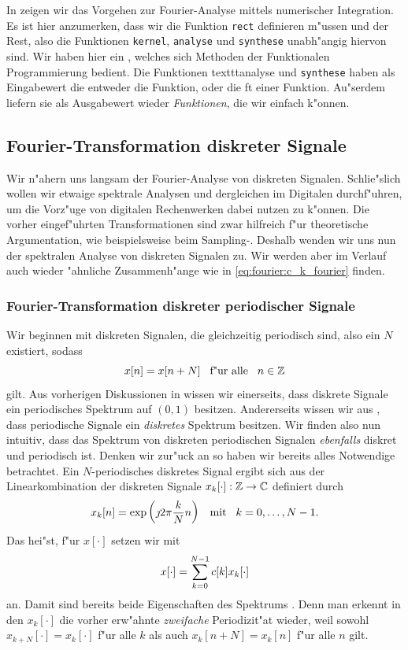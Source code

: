 In  zeigen wir das Vorgehen zur Fourier-Analyse mittels numerischer Integration.
Es ist hier anzumerken, dass wir  die Funktion \texttt{rect} definieren m"ussen und der Rest, also die Funktionen \texttt{kernel}, \texttt{analyse} und \texttt{synthese} unabh"angig hiervon sind.
Wir haben hier ein , welches sich Methoden der Funktionalen Programmierung bedient.
Die Funktionen texttt{analyse} und \texttt{synthese} haben als Eingabewert die entweder die Funktion, oder die \acrlong{ft} einer Funktion.
Au"serdem liefern sie als Ausgabewert wieder \emph{Funktionen}, die wir einfach  k"onnen.
%
\subsection{Fourier-Transformation diskreter Signale}\label{sec:fourier:disc}
%
Wir n"ahern uns langsam der Fourier-Analyse von diskreten Signalen.
Schlie"slich wollen wir etwaige spektrale Analysen und dergleichen im Digitalen durchf"uhren, um die Vorz"uge von digitalen Rechenwerken dabei nutzen zu k"onnen.
Die vorher eingef"uhrten Transformationen sind zwar hilfreich f"ur theoretische Argumentation, wie beispielsweise beim Sampling-. 
Deshalb wenden wir uns nun der spektralen Analyse von diskreten Signalen zu.
Wir werden aber im Verlauf auch wieder "ahnliche Zusammenh"ange wie in \eqref{eq:fourier:c_k_fourier} finden.
%
\subsubsection{Fourier-Transformation diskreter periodischer Signale}\label{sec:fourier:disc_period}
%
Wir beginnen mit diskreten Signalen, die gleichzeitig periodisch sind, also ein $N$ existiert, sodass
\[
x[n] = x[n+N] {\hspace{3mm} \text{f"ur alle} \hspace{3mm}} n \in \mathbb{Z} 
\]
gilt.
Aus vorherigen Diskussionen in  wissen wir einerseits, dass diskrete Signale ein periodisches Spektrum auf $(0,1)$ besitzen.
Andererseits wissen wir aus , dass periodische Signale ein \emph{diskretes} Spektrum besitzen.
Wir finden also nun intuitiv, dass das Spektrum von diskreten periodischen Signalen \emph{ebenfalls} diskret und periodisch ist.
Denken wir zur"uck an  so haben wir bereits alles Notwendige betrachtet.
Ein $N$-periodisches diskretes Signal ergibt sich aus der Linearkombination der diskreten Signale $x_k[\cdot] : \mathbb{Z} \rightarrow \mathbb{C}$ definiert durch
\[
x_k[n] = \exp\left(\jmath 2 \pi \frac k N n \right) {\hspace{3mm} \text{mit} \hspace{3mm}} k = 0, \ldots, N-1.
\]
Das hei"st, f"ur $x[\cdot]$ setzen wir mit
\[
x[\cdot] = {\sum\limits_{k = 0}^{N-1}{c[k] x_k[\cdot]}}
\]
an.
Damit sind bereits beide Eigenschaften des Spektrums .
Denn man erkennt in den $x_{k}[\cdot]$ die vorher erw"ahnte \emph{zweifache} Periodizit"at wieder, weil sowohl $x_{k+N}[\cdot] = x_{k}[\cdot]$ f"ur alle $k$ als auch $x_k[n+N] = x_k[n]$ f"ur alle $n$ gilt.

